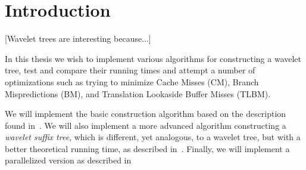 \section{Introduction}
[Wavelet trees are interesting because...]

In this thesis we wish to implement various algorithms for constructing a wavelet tree, test and compare their running times and attempt a number of optimizations such as trying to minimize Cache Misses (CM), Branch Mispredictions (BM), and Translation Lookaside Buffer Misses (TLBM).

We will implement the basic construction algorithm based on the description found in~\citep{ Navjda13}. 
We will also implement a more advanced algorithm constructing a \textit{wavelet suffix tree}, which is different, yet analogous, to a wavelet tree, but with a better theoretical running time, as described in~\citep{DBLP:journals/corr/BabenkoGKS14}. Finally, we will implement a parallelized version as described in~\citep{DBLP:journals/corr/Shun14}
